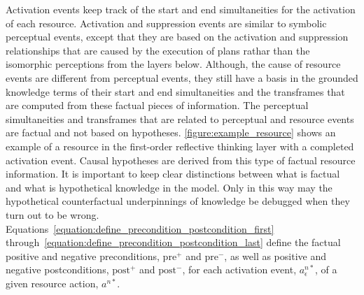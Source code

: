 Activation events keep track of the start and end simultaneities for
the activation of each resource.  Activation and suppression events
are similar to symbolic perceptual events, except that they are based
on the activation and suppression relationships that are caused by the
execution of plans rathar than the isomorphic perceptions from the
layers below.  Although, the cause of resource events are different
from perceptual events, they still have a basis in the grounded
knowledge terms of their start and end simultaneities and the
transframes that are computed from these factual pieces of
information.  The perceptual simultaneities and transframes that are
related to perceptual and resource events are factual and not based on
hypotheses.  {\mbox{\autoref{figure:example_resource}}} shows an
example of a resource in the first-order reflective thinking layer
with a completed activation event.  Causal hypotheses are derived from
this type of factual resource information.  It is important to keep
clear distinctions between what is factual and what is hypothetical
knowledge in the model.  Only in this way may the hypothetical
counterfactual underpinnings of knowledge be debugged when they turn
out to be wrong.
Equations\ \ref{equation:define_precondition_postcondition_first}
through\ \ref{equation:define_precondition_postcondition_last} define
the factual positive and negative preconditions, $\text{pre}^{+}$ and
$\text{pre}^{-}$, as well as positive and negative postconditions,
$\text{post}^{+}$ and $\text{post}^{-}$, for each activation event,
$a^{n*}_\epsilon$, of a given resource action, $a^{n*}$.
